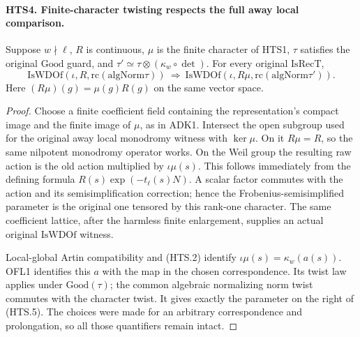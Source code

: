 \paragraph{HTS4. Finite-character twisting respects the full away local comparison.}
\label{claim:HTS4}
Suppose $w\nmid\ell$, $R$ is continuous, $\mu$ is the finite
character of HTS1, $\tau$ satisfies the original $\mathrm{Good}$
guard, and $\tau'\simeq\tau\otimes(\kappa_w\circ\det)$.
For every original $\mathrm{IsRecT}$,
\[
 \mathrm{IsWDOf}(\iota,R,\mathrm{rc}(\mathrm{algNorm}\tau))
 \ \Longrightarrow\
 \mathrm{IsWDOf}(\iota,R\mu,\mathrm{rc}(\mathrm{algNorm}\tau')).
                                                               \tag{HTS.5}
\]
Here $(R\mu)(g)=\mu(g)R(g)$ on the same vector space.
\begin{proof}
Choose a finite coefficient field containing the representation's
compact image and the finite image of $\mu$, as in ADK1.
Intersect the open subgroup used for the original away local
monodromy witness with $\ker\mu$.  On it $R\mu=R$, so the
same nilpotent monodromy operator works.  On the Weil group
the resulting raw action is the old action multiplied by
$\iota\mu(s)$.  This follows immediately from the defining
formula $R(s)\exp(-t_\ell(s)N)$.  A scalar factor commutes with
the action and its semisimplification correction; hence the
Frobenius-semisimplified parameter is the original one tensored
by this rank-one character.  The same coefficient lattice,
after the harmless finite enlargement, supplies an actual
original $\mathrm{IsWDOf}$ witness.

Local-global Artin compatibility and (HTS.2) identify
$\iota\mu(s)=\kappa_w(a(s))$.  OFL1 identifies this $a$ with
the map in the chosen correspondence.  Its twist law applies
under $\mathrm{Good}(\tau)$; the common algebraic normalizing
norm twist commutes with the character twist.  It gives exactly
the parameter on the right of (HTS.5).  The choices were made
for an arbitrary correspondence and prolongation, so all those
quantifiers remain intact.
\end{proof}

